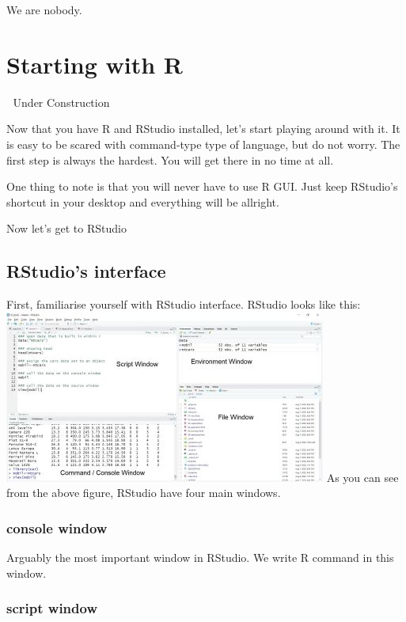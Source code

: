 \documentclass[
]{book}
\begin{document}
We are nobody.

\hypertarget{starting-with-r}{%
\chapter{Starting with R}\label{starting-with-r}}

🚧 Under Construction 🚧

Now that you have R and RStudio installed, let's start playing around with it. It is easy to be scared with command-type type of language, but do not worry. The first step is always the hardest. You will get there in no time at all.

One thing to note is that you will never have to use R GUI. Just keep RStudio's shortcut in your desktop and everything will be allright.

Now let's get to RStudio

\hypertarget{rstudios-interface}{%
\section{RStudio's interface}\label{rstudios-interface}}

First, familiarise yourself with RStudio interface. RStudio looks like this:
\includegraphics{tampilanR2.JPG}
As you can see from the above figure, RStudio have four main windows.

\hypertarget{console-window}{%
\subsection{console window}\label{console-window}}

Arguably the most important window in RStudio. We write R command in this window.

\hypertarget{script-window}{%
\subsection{script window}\label{script-window}}
\end{document}
